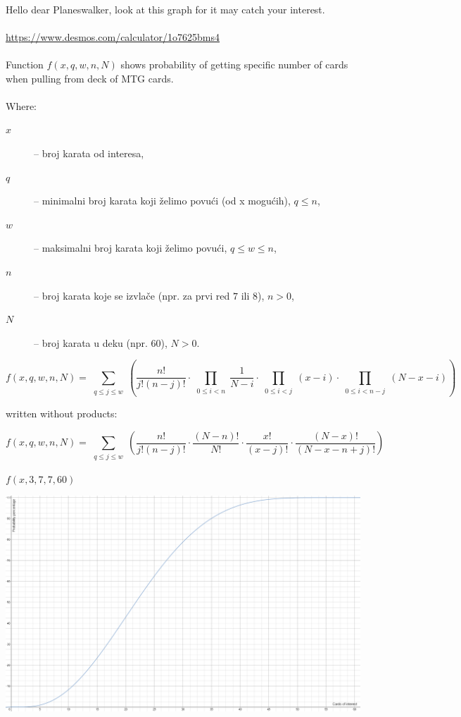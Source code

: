\documentclass{article}
\begin{document}
\paragraph{}
Hello dear Planeswalker, look at this graph for it may catch your interest.

\paragraph{}
\url{https://www.desmos.com/calculator/1o7625bms4}

\paragraph{}
Function $f(x,q,w,n,N)$ shows probability of getting specific number of cards
when pulling from deck of MTG cards.

\paragraph{}
Where:
\begin{description}
    \item[$x$] -- broj karata od interesa,
    \item[$q$] -- minimalni broj karata koji želimo povući (od x mogućih),
                  $q\leq n$,
    \item[$w$] -- maksimalni broj karata koji želimo povući, $q\leq w\leq n$,
    \item[$n$] -- broj karata koje se izvlače (npr. za prvi red $7$ ili $8$),
                  $n > 0$,
    \item[$N$] -- broj karata u deku (npr. $60$), $N > 0$.
\end{description}




$$
f(x, q, w, n, N) = 
\sum_{\substack{q\leq j\leq w}}
\left(
\frac{n!}{j! (n-j)!} \cdot
\prod_{\substack{0\leq i< n}}
\frac{1}{N-i} \cdot
\prod_{\substack{0\leq i< j}}
(x-i) \cdot
\prod_{\substack{0\leq i< n-j}}
(N-x-i)
\right)
$$

written without products:

$$
f(x, q, w, n, N) = 
\sum_{\substack{q\leq j\leq w}}
\left(
\frac{n!}{j! (n-j)!} \cdot
\frac{(N-n)!}{N!} \cdot
\frac{x!}{(x-j)!} \cdot
\frac{(N-x)!}{(N-x-n+j)!}
\right)
$$

$f(x, 3, 7, 7, 60)$

\includegraphics[width=\linewidth]{img/x_03_07_07_60_20141125_01.png}
\end{document}
